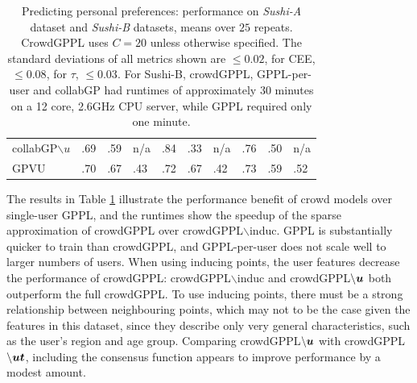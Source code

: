 \begin{table}
\begin{tabular}{l l l l@{\hskip 0.5cm} l l l@{\hskip 0.5cm} l l l}
\\
collabGP$\backslash u$ & .69 & .59 & n/a & .84 & .33 & n/a & .76 & .50 & n/a
\\
GPVU & .70 & .67 & .43 & .72 & .67 & .42 & .73 & .59 & .52
\\ \bottomrule
\end{tabular}
\caption{Predicting personal preferences: performance on \emph{Sushi-A} dataset and \emph{Sushi-B} datasets,
means over $25$ repeats. 
CrowdGPPL uses $C=20$ unless otherwise specified.
The standard deviations of all metrics shown are $\leq 0.02$, for CEE, $\leq 0.08$, for $\tau$, $\leq 0.03$.
For Sushi-B, crowdGPPL, GPPL-per-user and collabGP had runtimes of approximately 30 minutes on a 12 core, 2.6GHz CPU server,
while GPPL required only one minute.
 }
\label{tab:sushi}
\end{table}
The results in Table \ref{tab:sushi} 
illustrate the performance benefit of crowd models over single-user GPPL, and
the runtimes 
show the speedup of the sparse approximation of crowdGPPL over crowdGPPL$\backslash$induc.
GPPL is substantially quicker to train than crowdGPPL, and GPPL-per-user does not scale well to larger numbers
of users.
 When using inducing points, the user features decrease the performance of crowdGPPL: 
 crowdGPPL$\backslash$induc
 and crowdGPPL$\backslash\boldsymbol u$ both outperform the full crowdGPPL. 
 To use inducing points,
 there must be a strong relationship between neighbouring points, which
 may not to be the case given the features in this dataset, since
 they describe only very general characteristics, such as the user's region and age group.
 Comparing crowdGPPL$\backslash\boldsymbol u$ with crowdGPPL$\backslash\boldsymbol u\boldsymbol t$, including the consensus function appears to improve performance by a modest amount.
